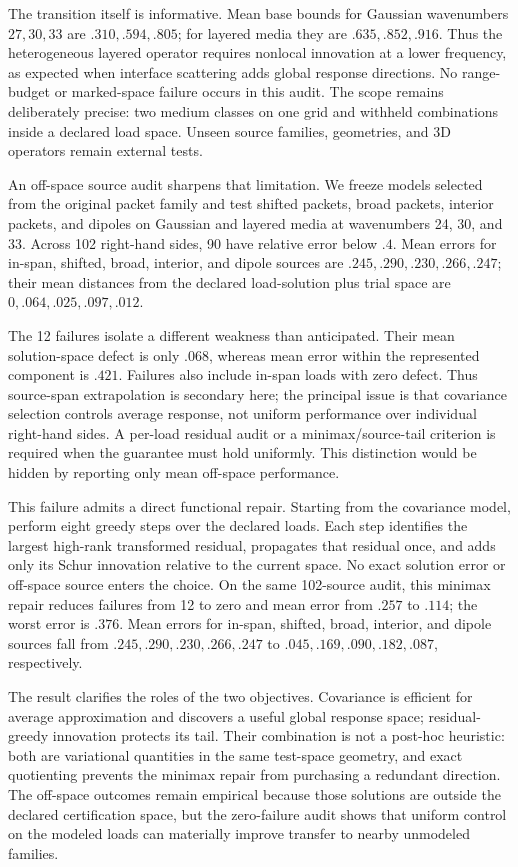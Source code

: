 \documentclass[11pt]{article}
\numberwithin{algorithm}{section}
\theoremstyle{definition}\newtheorem{definition}[theorem]{Definition}
\theoremstyle{remark}\newtheorem{remark}[theorem]{Remark}
\begin{document}
The transition itself is informative. Mean base bounds for Gaussian
wavenumbers $27,30,33$ are $.310,.594,.805$; for layered media they are
$.635,.852,.916$. Thus the heterogeneous layered operator requires nonlocal
innovation at a lower frequency, as expected when interface scattering adds
global response directions. No range-budget or marked-space failure occurs in
this audit. The scope remains deliberately precise: two medium classes on one
grid and withheld combinations inside a declared load space. Unseen source
families, geometries, and 3D operators remain external tests.

An off-space source audit sharpens that limitation. We freeze models selected
from the original packet family and test shifted packets, broad packets,
interior packets, and dipoles on Gaussian and layered media at wavenumbers
24, 30, and 33. Across 102 right-hand sides, 90 have relative error below $.4$.
Mean errors for in-span, shifted, broad, interior, and dipole sources are
$.245,.290,.230,.266,.247$; their mean distances from the declared
load-solution plus trial space are $0,.064,.025,.097,.012$.

The 12 failures isolate a different weakness than anticipated. Their mean
solution-space defect is only $.068$, whereas mean error within the represented
component is $.421$. Failures also include in-span loads with zero defect.
Thus source-span extrapolation is secondary here; the principal issue is that
covariance selection controls average response, not uniform performance over
individual right-hand sides. A per-load residual audit or a minimax/source-tail
criterion is required when the guarantee must hold uniformly. This distinction
would be hidden by reporting only mean off-space performance.

This failure admits a direct functional repair. Starting from the covariance
model, perform eight greedy steps over the declared loads. Each step identifies
the largest high-rank transformed residual, propagates that residual once, and
adds only its Schur innovation relative to the current space. No exact solution
error or off-space source enters the choice. On the same 102-source audit, this
minimax repair reduces failures from 12 to zero and mean error from $.257$ to
$.114$; the worst error is $.376$. Mean errors for in-span, shifted, broad,
interior, and dipole sources fall from $.245,.290,.230,.266,.247$ to
$.045,.169,.090,.182,.087$, respectively.

The result clarifies the roles of the two objectives. Covariance is efficient
for average approximation and discovers a useful global response space;
residual-greedy innovation protects its tail. Their combination is not a
post-hoc heuristic: both are variational quantities in the same test-space
geometry, and exact quotienting prevents the minimax repair from purchasing a
redundant direction. The off-space outcomes remain empirical because those
solutions are outside the declared certification space, but the zero-failure
audit shows that uniform control on the modeled loads can materially improve
transfer to nearby unmodeled families.
\end{document}
